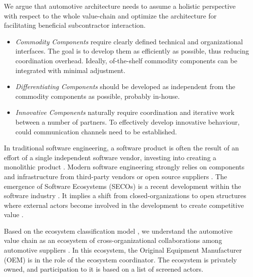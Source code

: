 We argue that automotive architecture needs to assume a holistic perspective with respect to the whole value-chain and optimize the architecture for facilitating beneficial subcontractor interaction. 
\begin{itemize}
\item \textit{Commodity Components} require clearly defined technical and organizational interfaces. 
The goal is to develop them as efficiently as possible, thus reducing coordination overhead. 
Ideally, of-the-shelf commodity components can be integrated with minimal adjustment. 
\item \textit{Differentiating Components} should be developed as independent from the commodity components as possible, probably in-house. 
\item \textit{Innovative Components} naturally require coordination and iterative work between a number of partners. 
To effectively develop innovative behaviour, could communication channels need to be established. 
\end{itemize}


In traditional software engineering, a software product is often the result of an effort of a single independent software vendor, investing into creating a monolithic product \cite{jansen2013defining, wnuk2014evaluating}.
Modern software engineering strongly relies on components and infrastructure from third-party vendors or open source suppliers \cite{jansen2013defining, wnuk2014evaluating}.
The emergence of Software Ecosystems (SECOs) is a recent development within the software industry \cite{hanssen2012longitudinal, wnuk2014evaluating}.
It implies a shift from closed-organizations to open structures where external actors become involved in the development to create competitive value \cite{jansen2013defining, hanssen2012longitudinal}.

Based on the ecosystem classification model \cite{jansen2013defining}, we  understand the automotive value chain as an ecosystem of cross-organizational collaborations among automotive suppliers \cite {knauss2014towards}. 
In this ecosystem, the Original Equipment Manufacturer (OEM) is in the role of the ecosystem coordinator.
The ecosystem is privately owned, and participation to it is based on a list of screened actors. 

